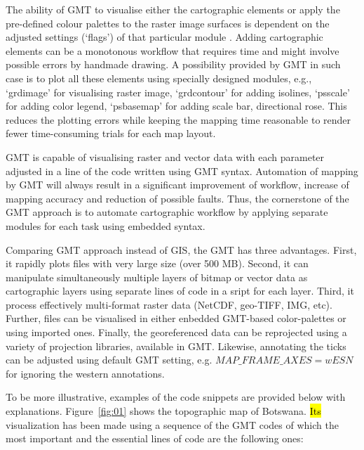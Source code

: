 \documentclass[ijgi,article,submit,pdftex,moreauthors]{Definitions/mdpi}
\begin{document}
 The ability of GMT to visualise either the cartographic elements or apply the pre-defined colour palettes to the raster image surfaces is dependent on the adjusted settings (‘flags’) of that particular module \cite{Lemenkova202213}. Adding cartographic elements can be a monotonous workflow that requires time and might involve possible errors by handmade drawing. A possibility provided by GMT in such case is to plot all these elements using specially designed modules, e.g., ‘grdimage’ for visualising raster image, ‘grdcontour’ for adding isolines, ‘psscale’ for adding color legend, ‘psbasemap’ for adding scale bar, directional rose. This reduces the plotting errors while keeping the mapping time reasonable to render fewer time-consuming trials for each map layout.

GMT is capable of visualising raster and vector data with each parameter adjusted in a line of the code written using GMT syntax. Automation of mapping by GMT will always result in a significant improvement of workflow, increase of mapping accuracy and reduction of possible faults. Thus, the cornerstone of the GMT approach is to automate cartographic workflow by applying separate modules for each task using embedded syntax. 	

Comparing GMT approach instead of GIS, the GMT has three advantages. First, it rapidly plots files with very large size (over 500 MB). Second, it can manipulate simultaneously multiple layers of bitmap or vector data as cartographic layers using separate lines of code in a sript for each layer. Third, it process effectively multi-format raster data (NetCDF, geo-TIFF, IMG, etc). Further, files can be visualised in either enbedded GMT-based color-palettes or using imported ones. Finally, the georeferenced data can be reprojected using a variety of projection libraries, available in GMT. Likewise, annotating the ticks can be adjusted using default GMT setting, e.g. $MAP\_FRAME\_AXES=wESN$ for ignoring the western annotations.

To be more illustrative, examples of the code snippets are provided below with explanations. Figure~\ref{fig:01} shows the topographic map of Botswana. \hl{Its} visualization has been made using a sequence of the GMT codes of which the most important and the essential lines of code are the following ones:
\end{document}
